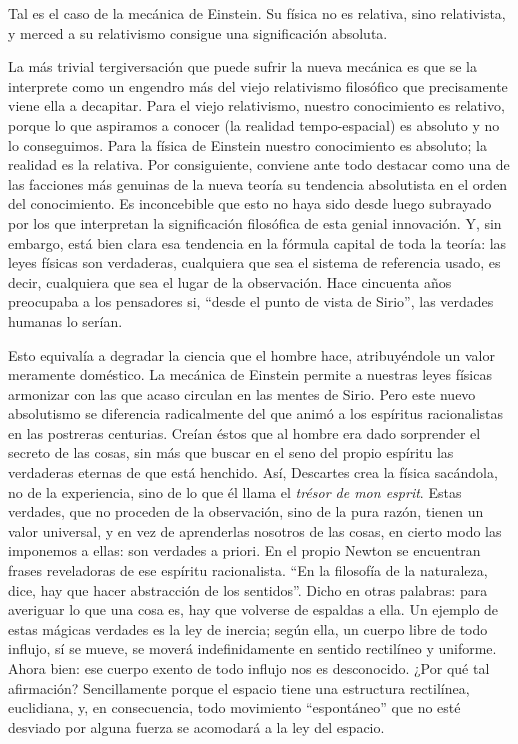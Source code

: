 \documentclass[a4paper, 12pt]{article}
\begin{document}
Tal es el caso de la mecánica de Einstein. Su física no es relativa, sino
relativista, y merced a su relativismo consigue una significación
absoluta.

La más trivial tergiversación que puede sufrir la nueva mecánica es que se
la interprete como un engendro más del viejo relativismo filosófico que
precisamente viene ella a decapitar. Para el viejo relativismo, nuestro
conocimiento es relativo, porque lo que aspiramos a conocer (la realidad
tempo-espacial) es absoluto y no lo conseguimos. Para la física de
Einstein nuestro conocimiento es absoluto; la realidad es la relativa.
Por consiguiente, conviene ante todo destacar como una de las facciones
más genuinas de la nueva teoría su tendencia absolutista en el orden del
conocimiento. Es inconcebible que esto no haya sido desde luego subrayado
por los que interpretan la significación filosófica de esta genial
innovación. Y, sin embargo, está bien clara esa tendencia en la fórmula
capital de toda la teoría: las leyes físicas son verdaderas, cualquiera
que sea el sistema de referencia usado, es decir, cualquiera que sea el
lugar de la observación. Hace cincuenta años preocupaba a los pensadores
si, ``desde  el punto de vista de Sirio'', las verdades humanas lo serían.


Esto equivalía a degradar la ciencia que el hombre hace, atribuyéndole un
valor meramente doméstico. La mecánica de Einstein permite a nuestras
leyes físicas armonizar con las que acaso circulan en las mentes de Sirio.
Pero este nuevo absolutismo se diferencia radicalmente del que animó a los
espíritus racionalistas en las postreras centurias. Creían éstos que al
hombre era dado sorprender el secreto de las cosas, sin más que buscar en
el seno del propio espíritu las verdaderas eternas de que está henchido.
Así, Descartes crea la física sacándola, no de la experiencia, sino de lo
que él llama el {\it trésor de mon esprit}. Estas verdades, que no proceden de
la observación, sino de la pura razón, tienen un valor universal, y en vez
de aprenderlas nosotros de las cosas, en cierto modo las imponemos a
ellas: son verdades a priori. En el propio Newton se encuentran frases
reveladoras de ese espíritu racionalista. ``En la filosofía de la
naturaleza, dice, hay que hacer abstracción de los sentidos''. Dicho en
otras palabras: para averiguar lo que una cosa es, hay que volverse de
espaldas a ella. Un ejemplo de estas mágicas verdades es la ley de
inercia; según ella, un cuerpo libre de todo influjo, sí se mueve, se
moverá indefinidamente en sentido rectilíneo y uniforme. Ahora bien: ese
cuerpo exento de todo influjo nos es desconocido. ¿Por qué tal afirmación?
Sencillamente porque el espacio tiene una estructura rectilínea,
euclidiana, y, en consecuencia, todo movimiento ``espontáneo'' que no esté
desviado por alguna fuerza se acomodará a la ley del espacio.
\end{document}
